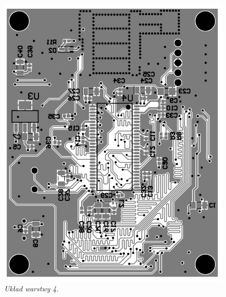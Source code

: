 \documentclass[eng,printmode]{mgr}
\begin{document}
\begin{center}\centering
\begin{figure}[!h]
\vskip 2cm
    \centering
    \includegraphics[width=\textwidth]{pcb/bottom.png}
    \caption{\textit{\scriptsize Układ warstwy 4.}}
\end{figure}
\end{center}
\end{document}
